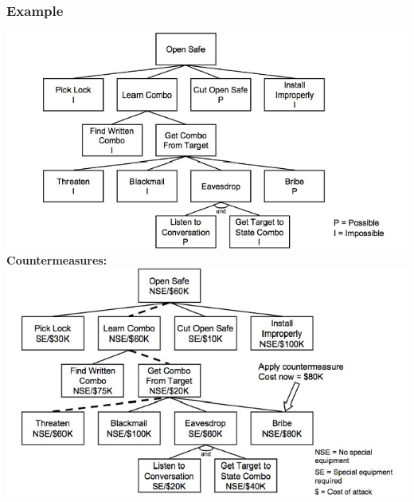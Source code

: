 \subsubsection{Example}
\includegraphics[width=\linewidth]{../img/attack_tree_example.png}
\textbf{Countermeasures:}\\ 
\includegraphics[width=\linewidth]{../img/attack_tree_example2.png}
